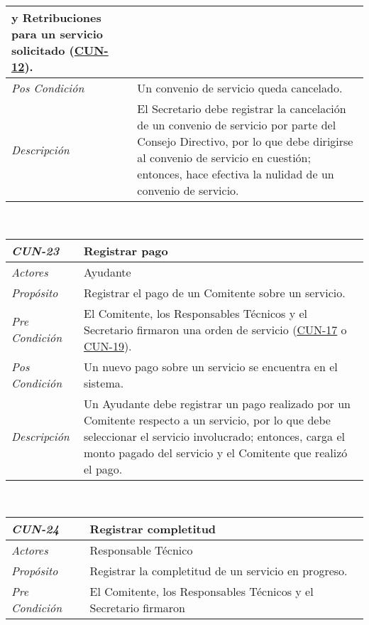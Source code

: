 \begin{center}
{\begin{tabular}{ | p{3cm} | p{12.5cm} | }
	y Retribuciones para un servicio solicitado
	(\hyperlink{CUN-12}{CUN-12}). \\
	\hline
	\raggedleft \textit{Pos Condici\'on} & Un convenio de
	servicio queda cancelado. \\
	\hline
	\raggedleft \textit{Descripci\'on} &
	El Secretario debe registrar la cancelaci\'on de un
	convenio de servicio por parte del Consejo Directivo,
	por lo que debe dirigirse al convenio de servicio en
	cuesti\'on; entonces, hace efectiva la nulidad de
	un convenio de servicio. \\
	\hline
\end{tabular}} \\[1cm]
\hypertarget{CUN-23}{%
\begin{tabular}{ | p{3cm} | p{12.5cm} | }
	\hline
	\rowcolor{lightgray}
	\hfil \textbf{\textit{CUN-23}} &
	\hfil \textbf{Registrar pago} \\
	\hline
	\raggedleft \textit{Actores} & Ayudante \\
	\hline
	\raggedleft \textit{Prop\'osito} & Registrar el
	pago de un Comitente sobre un servicio. \\
	\hline
	\raggedleft \textit{Pre Condici\'on} & El Comitente,
	los Responsables T\'ecnicos y el Secretario firmaron
	una orden de servicio
	(\hyperlink{CUN-17}{CUN-17} o
	\hyperlink{CUN-19}{CUN-19}). \\
	\hline
	\raggedleft \textit{Pos Condici\'on} & Un nuevo pago
	sobre un servicio se encuentra en el sistema. \\
	\hline
	\raggedleft \textit{Descripci\'on} &
	Un Ayudante debe registrar un pago realizado por un
	Comitente respecto a un servicio, por lo que debe
	seleccionar el servicio involucrado; entonces, carga
	el monto pagado del servicio y el Comitente que
	realiz\'o el pago. \\
	\hline
\end{tabular}} \\[1cm]
\hypertarget{CUN-24}{%
\begin{tabular}{ | p{3cm} | p{12.5cm} | }
	\hline
	\rowcolor{lightgray}
	\hfil \textbf{\textit{CUN-24}} &
	\hfil \textbf{Registrar completitud} \\
	\hline
	\raggedleft \textit{Actores} & Responsable T\'ecnico \\
	\hline
	\raggedleft \textit{Prop\'osito} & Registrar la
	completitud de un servicio en progreso. \\
	\hline
	\raggedleft \textit{Pre Condici\'on} & El Comitente,
	los Responsables T\'ecnicos y el Secretario firmaron

\end{tabular}}
\end{center}
